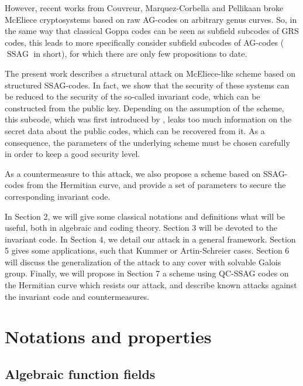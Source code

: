 \documentclass[10pt]{article}
\theoremstyle{definition}
\theoremstyle{definition}
\theoremstyle{definition}
\newcommand{\s}{\vspace{0.3cm}}
\newcommand{\ssag}{\operatorname{SSAG}}
\begin{document}
However, recent works from Couvreur, Marquez-Corbella and Pellikaan \cite{CMP} broke McEliece cryptosystems based on raw AG-codes on arbitrary genus curves. So, in the same way that classical Goppa codes can be seen as subfield subcodes of GRS codes, this leads to more specifically consider subfield subcodes of AG-codes ($\ssag$ in short), for which there are only few propositions to date.

\s

The present work describes a structural attack on McEliece-like scheme based on structured SSAG-codes. In fact, we show that the security of these systems can be reduced to the security of the so-called invariant code, which can be constructed from the public key. Depending on the assumption of the scheme, this subcode, which was first introduced by \cite{LOI}, leaks too much information on the secret data about the public codes, which can be recovered from it. As a consequence, the parameters of the underlying scheme must be chosen carefully in order to keep a good security level.

\s

As a countermeasure to this attack, we also propose a scheme based on SSAG-codes from the Hermitian curve, and provide a set of parameters to secure the corresponding invariant code.

\s

In Section 2, we will give some classical notations and definitions what will be useful, both in algebraic and coding theory. Section 3 will be devoted to the invariant code. In Section 4, we detail our attack in a general framework. Section 5 gives some applications, such that Kummer or Artin-Schreier cases. Section 6 will discuss the generalization of the attack to any cover with solvable Galois group. Finally, we will propose in Section 7 a scheme using QC-SSAG codes on the Hermitian curve which resists our attack, and describe known attacks against the invariant code and countermeasures.


\s

\section{Notations and properties}

\s

\subsection{Algebraic function fields}
\end{document}
